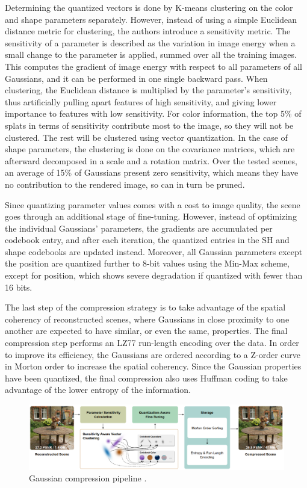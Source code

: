 Determining the quantized vectors is done by K-means clustering on the color and shape parameters separately. However, instead of using a simple Euclidean distance metric for clustering, the authors introduce a sensitivity metric.  The sensitivity of a parameter is described as the variation in image energy when a small change to the parameter is applied, summed over all the training images. This computes the gradient of image energy with respect to all parameters of all Gaussians, and it can be performed in one single backward pass. When clustering, the Euclidean distance is multiplied by the parameter's sensitivity, thus artificially pulling apart features of high sensitivity, and giving lower importance to features with low sensitivity. For color information, the top 5\% of splats in terms of sensitivity contribute most to the image, so they will not be clustered. The rest will be clustered using vector quantization. In the case of shape parameters, the clustering is done on the covariance matrices, which are afterward decomposed in a scale and a rotation matrix. Over the tested scenes, an average of 15\% of Gaussians present zero sensitivity, which means they have no contribution to the rendered image, so can in turn be pruned. 

Since quantizing parameter values comes with a cost to image quality, the scene goes through an additional stage of fine-tuning. However, instead of optimizing the individual Gaussians' parameters, the gradients are accumulated per codebook entry, and after each iteration, the quantized entries in the SH and shape codebooks are updated instead. Moreover, all Gaussian parameters except the position are quantized further to 8-bit values using the Min-Max scheme, except for position, which shows severe degradation if quantized with fewer than 16 bits. 

The last step of the compression strategy is to take advantage of the spatial coherency of reconstructed scenes, where Gaussians in close proximity to one another are expected to have similar, or even the same, properties. The final compression step performs an LZ77 run-length encoding over the data. In order to improve its efficiency, the Gaussians are ordered according to a Z-order curve in Morton order to increase the spatial coherency. Since the Gaussian properties have been quantized, the final compression also uses Huffman coding to take advantage of the lower entropy of the information.

\begin{figure}[H]
    \centering
    \includegraphics[width=0.8\linewidth]{figures/compression.png}
    \caption{Gaussian compression pipeline \cite{Niedermayr_2024_CVPR}.}
    \label{fig:compression}
\end{figure}

